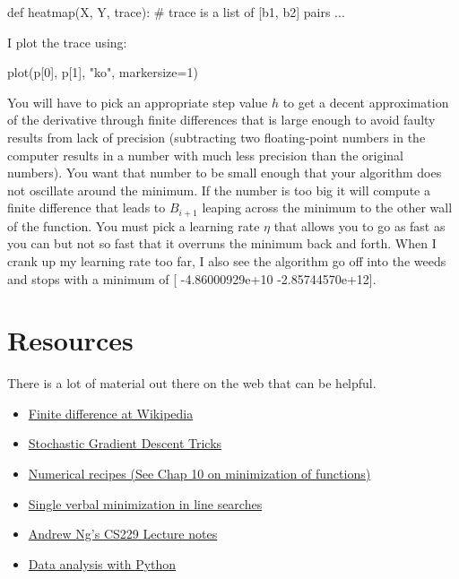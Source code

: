 \begin{fullwidth}
\begin{pyverbatim}
def heatmap(X, Y, trace): # trace is a list of [b1, b2] pairs
    ...
\end{pyverbatim}

\noindent I plot the trace using:

\begin{pyverbatim}
plot(p[0], p[1], "ko", markersize=1)
\end{pyverbatim}

You will have to pick an appropriate step value $h$ to get a decent approximation of the derivative through finite differences that is large enough to avoid faulty results from lack of precision (subtracting two floating-point numbers in the computer results in a number with much less precision than the original numbers). You want that number to be small enough that your algorithm does not oscillate around the minimum. If the number is too big it will compute a finite difference that leads to $B_{i+1}$ leaping across the minimum to the other wall of the function. You must pick a learning rate $\eta$ that allows you to go as fast as you can but not so fast that it overruns the minimum back and forth. When I crank up my learning rate too far, I also see the algorithm go off into the weeds and stops with a minimum of [ -4.86000929e+10  -2.85744570e+12].

\section{Resources}

There is a lot of material out there on the web that can be helpful.

\begin{itemize}
\item \href{http://en.wikipedia.org/wiki/Finite_difference}{Finite difference at Wikipedia}
\item \href{http://research.microsoft.com/pubs/192769/tricks-2012.pdf}{Stochastic Gradient Descent Tricks}
\item \href{http://apps.nrbook.com/fortran/index.html}{Numerical recipes (See Chap 10 on minimization of functions)}
\item \href{http://adl.stanford.edu/aa222/Lecture_Notes_files/AA222-Lecture2.pdf}{Single verbal minimization in line searches}
\item \href{http://cs229.stanford.edu/notes/cs229-notes1.pdf}{Andrew Ng's CS229 Lecture notes}
\item \href{http://people.duke.edu/~ccc14/pcfb/analysis.html}{Data analysis with Python}
\end{itemize}


\end{fullwidth}
